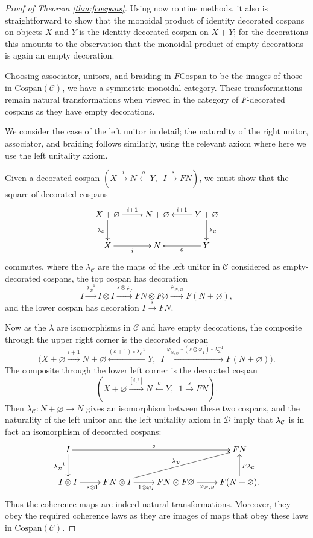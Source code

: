 \begin{proof}[Proof of Theorem \ref{thm:fcospans}]
Using now routine methods, it also is straightforward to show that the monoidal
product of identity decorated cospans on objects $X$ and $Y$ is the identity
decorated cospan on $X+Y$; for the decorations this amounts to the observation
that the monoidal product of empty decorations is again an empty decoration.

Choosing associator, unitors, and braiding in $F\mathrm{Cospan}$ to be the
images of those in $\mathrm{Cospan(\mathcal{C})}$, we have a symmetric
monoidal category. These transformations remain natural transformations when
viewed in the category of $F$-decorated cospans as they have empty
decorations.

We consider the case of the left unitor in detail; the naturality of the right
unitor, associator, and braiding follows similarly, using the relevant axiom
where here we use the left unitality axiom. 

Given a decorated cospan $(X \stackrel{i}\longrightarrow N
\stackrel{o}\longleftarrow Y,\enspace I \stackrel{s}\longrightarrow FN)$, we
must show that the square of decorated cospans
\[
  \xymatrix{
    X+\varnothing \ar[r]^{i+1} \ar[d]_{\lambda_{\mathcal C}} & N+\varnothing & Y+\varnothing
    \ar[l]_{i+1} \ar[d]^{\lambda_{\mathcal C}} \\
    X \ar[r]_{i} & N & Y \ar[l]^{o} 
  }
\]
commutes, where the $\lambda_{\mathcal C}$ are the maps of the left unitor in
$\mathcal C$ considered as empty-decorated cospans, the top cospan has
decoration 
\[
  I \stackrel{\lambda^{-1}_{\mathcal D}}{\longrightarrow} I \otimes I \stackrel{s \otimes
  \varphi_I}\longrightarrow FN \otimes F\varnothing
  \stackrel{\varphi_{N,\varnothing}}\longrightarrow F(N+\varnothing),
\]
and the lower cospan has decoration $I \stackrel{s}{\longrightarrow} FN$. 

Now as the $\lambda$ are isomorphisms in $\mathcal C$ and have empty
decorations, the composite through the upper right corner is the decorated
cospan
\[
  \big(X+\varnothing \xrightarrow{i+1} N+\varnothing
  \xleftarrow{(o+1)\circ \lambda^{-1}_{\mathcal C}} Y,\enspace I
  \xrightarrow{\varphi_{N,\varnothing} \circ (s \otimes \varphi_1) \circ
  \lambda^{-1}_{\mathcal D}} F(N+\varnothing)\big).
\]
The composite through the lower left corner is the decorated cospan
\[
  (X+\varnothing \stackrel{[i,!]}\longrightarrow N
\stackrel{o}\longleftarrow Y,\enspace 1 \stackrel{s}\longrightarrow FN).
\]
Then $\lambda_{\mathcal C}\colon  N+\varnothing \rightarrow N$ gives an isomorphism
between these two cospans, and the naturality of the left unitor and the left
unitality axiom in $\mathcal D$ imply that $\lambda_{\mathcal C}$ is in fact an
isomorphism of decorated cospans:
\[
  \xymatrix{
    I \ar[rrr]^{s} \ar[d]_{\lambda^{-1}_{\mathcal D}} &&& FN \\
    I \otimes I \ar[r]_{s \otimes 1} & FN \otimes I \ar[r]_{1 \otimes \varphi_I}
    \ar[urr]^{\lambda_{\mathcal D}} & FN \otimes F\varnothing
    \ar[r]_{\varphi_{N,\varnothing}} & F(N+\varnothing).
    \ar[u]_{F\lambda_{\mathcal C}}
  }
\]
Thus the coherence maps are indeed natural transformations. Moreover, they obey
the required coherence laws as they are images of maps that obey these laws in
$\mathrm{Cospan(\mathcal{C})}$. 


\end{proof}
